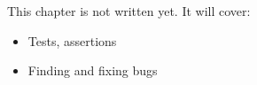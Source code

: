 \label{ch:py6}
\begin{keyidea}
This chapter is not written yet. It will cover:
\begin{itemize}[nosep]
  \item Tests, assertions
  \item Finding and fixing bugs
\end{itemize}
\end{keyidea}
